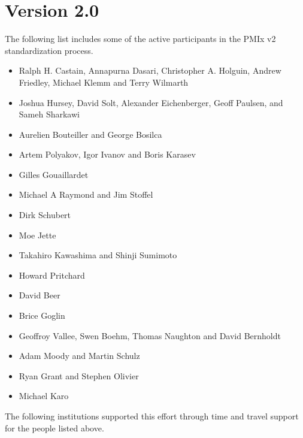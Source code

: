 \section{Version 2.0}

The following list includes some of the active participants in the PMIx v2 standardization process.

\begin{itemize}
\item Ralph H. Castain, Annapurna Dasari, Christopher A. Holguin, Andrew Friedley, Michael Klemm and Terry Wilmarth
\item Joshua Hursey, David Solt, Alexander Eichenberger, Geoff Paulsen, and Sameh Sharkawi
\item Aurelien Bouteiller and George Bosilca
\item Artem Polyakov, Igor Ivanov and Boris Karasev
\item Gilles Gouaillardet
\item Michael A Raymond and Jim Stoffel
\item Dirk Schubert
\item Moe Jette
\item Takahiro Kawashima and Shinji Sumimoto
\item Howard Pritchard
\item David Beer
\item Brice Goglin
\item Geoffroy Vallee, Swen Boehm, Thomas Naughton and David Bernholdt
\item Adam Moody and Martin Schulz
\item Ryan Grant and Stephen Olivier
\item Michael Karo
\end{itemize}

The following institutions supported this effort through time and travel support for the people listed above.

